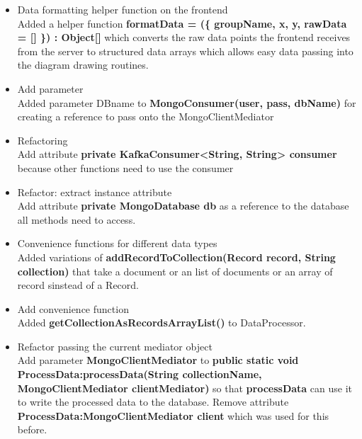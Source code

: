 \documentclass[oneside, english, final]{design}
\begin{document}
\begin{itemize}
  \item{Data formatting helper function on the frontend
        \\
        Added a helper function \textsf{\textbf{formatData = (\{ groupName, x, y, rawData = [] \}) : Object[] }} which converts the raw data points the frontend receives from the server to structured data arrays which allows easy data passing into the diagram drawing routines.}

  \item{Add parameter
        \\
        Added parameter DBname to \textsf{\textbf{MongoConsumer(user, pass, dbName)}} for creating a reference to pass onto the MongoClientMediator}

  \item{Refactoring
        \\
        Add attribute \textsf{\textbf{private KafkaConsumer<String, String> consumer}} because other functions need to use the consumer}

  \item{Refactor: extract instance attribute}
        \\
        Add attribute \textsf{\textbf{private MongoDatabase db}}
        as a reference to the database all methods need to access.

  \item{Convenience functions for different data types}
        \\
        Added variations of \textsf{\textbf{addRecordToCollection(Record record, String collection)}}
        that take a document or an list of documents or an array of record sinstead of a Record.


  \item{Add convenience function}
        \\
        Added \textsf{\textbf{getCollectionAsRecordsArrayList()}}
        to DataProcessor.

  \item{Refactor passing the current mediator object}
        \\
        Add parameter \textsf{\textbf{MongoClientMediator}} to \textsf{\textbf{public static void ProcessData:processData(String collectionName, MongoClientMediator clientMediator)}} so that \textsf{\textbf{processData}} can use it to write the processed data to the database. Remove attribute \textsf{\textbf{ProcessData:MongoClientMediator client}} which was used for this before.



\end{itemize}
\end{document}
